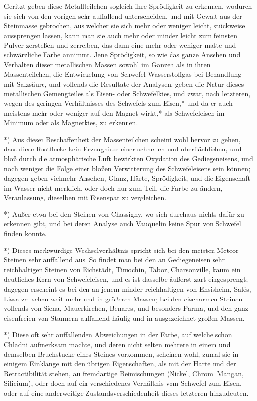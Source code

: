 \documentclass[a4paper, 11pt, oneside, german]{article}
\begin{document}
Geritzt geben diese Metallteilchen sogleich ihre Sprödigkeit zu erkennen, wodurch sie sich von den vorigen sehr auffallend unterscheiden, und mit Gewalt aus der Steinmasse gebrochen, aus welcher sie sich mehr oder weniger leicht, stückweise aussprengen lassen, kann man sie auch mehr oder minder leicht zum feinsten Pulver zerstoßen und zerreiben, das dann eine mehr oder weniger matte und schwärzliche Farbe annimmt. Jene Sprödigkeit, so wie das ganze Ansehen und Verhalten dieser metallischen Massen sowohl im Ganzen als in ihren Massenteilchen, die Entwickelung von Schwefel-Wasserstoffgas bei Behandlung mit Salzsäure, und vollends die Resultate der Analysen, geben die Natur dieses metallischen Gemengteiles als Eisen- oder Schwefelkies, und zwar, nach letzteren, wegen des geringen Verhältnisses des Schwefels zum Eisen,* und da er auch meistens mehr oder weniger auf den Magnet wirkt,* als Schwefeleisen im Minimum oder als Magnetkies, zu erkennen.

*) Aus dieser Beschaffenheit der Massenteilchen scheint wohl hervor zu gehen, dass diese Rostflecke kein Erzeugnisse einer schnellen und oberflächlichen, und bloß durch die atmosphärische Luft bewirkten Oxydation des Gediegeneisens, und noch weniger die Folge einer bloßen Verwitterung des Schwefeleisens sein können; dagegen geben vielmehr Ansehen, Glanz, Härte, Sprödigkeit, und die Eigenschaft im Wasser nicht merklich, oder doch nur zum Teil, die Farbe zu ändern, Veranlassung, dieselben mit Eisenspat zu vergleichen.

*) Außer etwa bei den Steinen von Chassigny, wo sich durchaus nichts dafür zu erkennen gibt, und bei deren Analyse auch Vauquelin keine Spur von Schwefel finden konnte.

*) Dieses merkwürdige Wechselverhältnis spricht sich bei den meisten Meteor-Steinen sehr auffallend aus. So findet man bei den an Gediegeneisen sehr reichhaltigen Steinen von Eichstädt, Timochin, Tabor, Charsonville, kaum ein deutliches Korn von Schwefeleisen, und es ist dasselbe äußerst zart eingesprengt; dagegen erscheint es bei den an jenem minder reichhaltigen von Ensisheim, Salés, Lissa zc. schon weit mehr und in größeren Massen; bei den eisenarmen Steinen vollends von Siena, Mauerkirchen, Benares, und besonders Parma, und den ganz eisenfreien von Stannern auffallend häufig und in ausgezeichnet großen Massen.

*) Diese oft sehr auffallenden Abweichungen in der Farbe, auf welche schon Chladni aufmerksam machte, und deren nicht selten mehrere in einem und demselben Bruchstucke eines Steines vorkommen, scheinen wohl, zumal sie in einigem Einklange mit den übrigen Eigenschaften, als mit der Harte und der Retractibilität stehen, au fremdartige Beimischungen (Nickel, Chrom, Mangan, Silicium), oder doch auf ein verschiedenes Verhältnis vom Schwefel zum Eisen, oder auf eine anderweitige Zustandsverschiedenheit dieses letzteren hinzudeuten.
\end{document}
